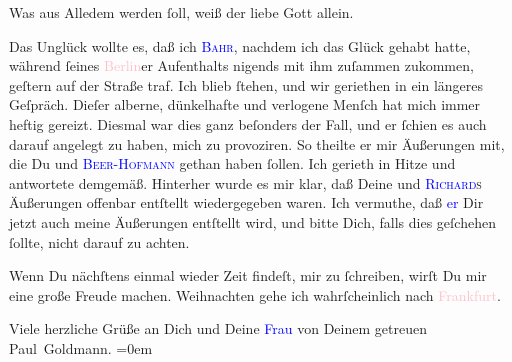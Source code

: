 \pstart
           Was aus Alledem werden ſoll, weiß der liebe Gott allein.\pend
           
\pstart
           Das Unglück wollte es, daß {\pb} ich \textsc{\textcolor{blue}{Bahr}{}\ledrightnote{\textcolor{blue}{Hermann Bahr}}}, nachdem ich das Glück gehabt hatte,  während ſeines \textcolor{pink}{Berlin}{}\ledrightnote{\textcolor{pink}{Berlin}}er Aufenthalts
               nigends mit ihm zuſammen zukommen, \introOben{}geſtern\introOben{} auf der Straße traf. Ich blieb ſtehen, und wir geriethen in ein längeres
               Geſpräch. Dieſer alberne, dünkelhafte und verlogene Menſch hat  mich immer heftig gereizt. Diesmal war dies ganz
               beſonders der Fall, und er ſchien es auch darauf angelegt zu haben, mich zu
               provoziren. So theilte er mir Äußerungen mit, die Du und \textsc{\textcolor{blue}{Beer-Hofmann}{}\ledrightnote{\textcolor{blue}{Richard Beer-Hofmann}}} gethan haben ſollen. Ich gerieth in Hitze und antwortete {\pb}demgemäß. Hinterher wurde es mir klar, daß Deine und
                  \textsc{\textcolor{blue}{Richard}{}\ledrightnote{\textcolor{blue}{Richard Beer-Hofmann}}s} Äußerungen offenbar entſtellt
               wiedergegeben waren. Ich vermuthe, daß \textcolor{blue}{er}{}\ledrightnote{{$\rightarrow$}\textcolor{blue}{Hermann Bahr}} Dir jetzt auch meine Äußerungen entſtellt \label{K_L03389-11v}\label{K_L03389-11h} wird, und bitte Dich, falls dies geſchehen ſollte,
               nicht darauf zu achten.\pend
           
\pstart
           Wenn Du nächſtens einmal wieder Zeit findeſt, mir zu ſchreiben, wirſt Du mir eine
               große Freude machen. Weihnachten gehe ich
               wahrſcheinlich nach {\pb}\textcolor{pink}{Frankfurt}{}\ledrightnote{\textcolor{pink}{Frankfurt am Main}}.\pend
           
\pstart
           Viele herzliche Grüße an Dich und Deine \textcolor{blue}{Frau}{}\ledrightnote{{$\rightarrow$}\textcolor{blue}{Olga Schnitzler}} von Deinem getreuen {\\[\baselineskip]}\spacefill\mbox{Paul Goldmann.}\pend
           \leftskip=0em{}\endnumbering{}
\begin{anhang}
\end{anhang}
      
